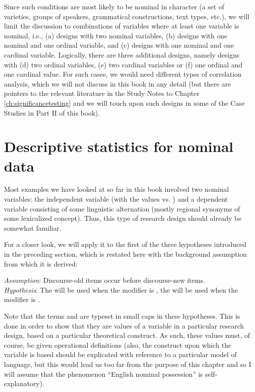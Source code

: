 Since such conditions are most likely to be nominal in character (a set of varieties, groups of speakers, grammatical constructions, text types, etc.), we will limit the discussion to combinations of variables where at least one variable is nominal, i.e., (a) designs with two nominal variables, (b) designs with one nominal and one ordinal variable, and (c) designs with one nominal and one cardinal variable. Logically, there are three additional designs, namely designs with (d) two ordinal variables, (e) two cardinal variables or (f) one ordinal and one cardinal value. For such cases, we would need different types of correlation analysis, which we will not discuss in this book in any detail (but there are pointers to the relevant literature in the Study Notes to Chapter \ref{ch:significancetesting} and we will touch upon such designs in some of the Case Studies in Part II of this book).

\section{Descriptive statistics for nominal data}
\label{sec:descriptivenominal}

Most examples we have looked at so far in this book involved two nominal variables: the independent variable  (with the values  vs. ) and a dependent variable consisting of some linguistic alternation (mostly regional synonyms of some lexicalized concept). Thus, this type of research design should already be somewhat familiar.

For a closer look, we will apply it to the first of the three hypotheses introduced in the preceding section, which is restated here with the background assumption from which it is derived:

\begin{exe}
\ex \emph{Assumption}: Discourse-old items occur before discourse-new items. \\
\emph{Hypothesis}: The  will be used when the modifier is , the  will be used when the modifier is .
\label{ex:givennesshypothesis}
\end{exe}

Note that the terms  and  are typeset in small caps in these hypotheses. This is done in order to show that they are values of a variable in a particular research design, based on a particular theoretical construct. As such, these values must, of course, be given operational definitions (also, the construct upon which the variable is based should be explicated with reference to a particular model of language, but this would lead us too far from the purpose of this chapter and so I will assume that the phenomenon ``English nominal possession'' is self-explanatory).


